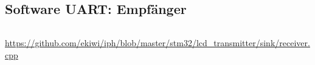 \documentclass[12pt,a4paper]{article}
\begin{document}
\subsection{Software UART: Empfänger}
\label{app:uart_receiver}
\inputminted[label=receiver.cpp,linenos,tabsize=4,fontsize=\normalsize,frame=lines,rulecolor=\color{gray!70},framerule=1pt]{c++}{../stm32/lcd_transmitter/sink/receiver.cpp}
\url{https://github.com/ekiwi/iph/blob/master/stm32/lcd\_transmitter/sink/receiver.cpp}
\end{document}

